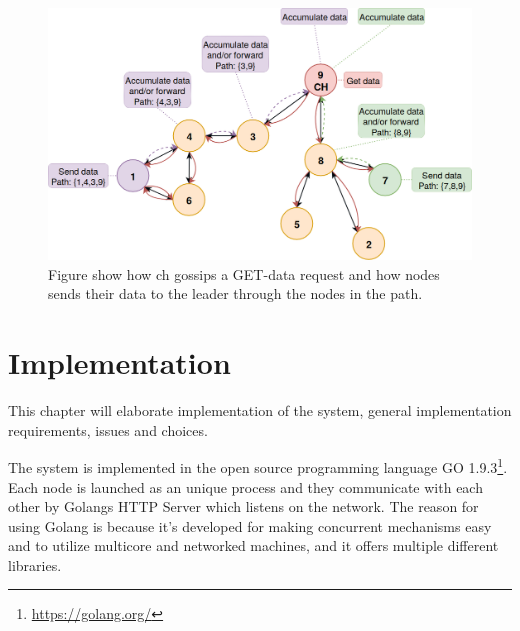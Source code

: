 \documentclass[USenglish]{uit-thesis}
\begin{document}

\begin{figure}
\centering
\includegraphics[width=\textwidth]{gatherSendData1.png}
\caption{Figure show how \gls{ch} gossips a GET-data request and how  nodes sends their data to the leader through the nodes in the path.}
\label{fig:gaterSendData}
\end{figure}



\chapter{Implementation} \label{chap:implementation}

This chapter will elaborate implementation of the system, general implementation requirements, issues and choices. 

The system is implemented in the open source programming language GO 1.9.3\footnote{\url{https://golang.org/}}. Each node is launched as an unique process and they communicate with each other by Golangs HTTP Server which listens on the  network. The reason for using Golang is because it's developed for making concurrent mechanisms easy and to utilize multicore and networked machines, and it offers multiple different libraries.
\end{document}
